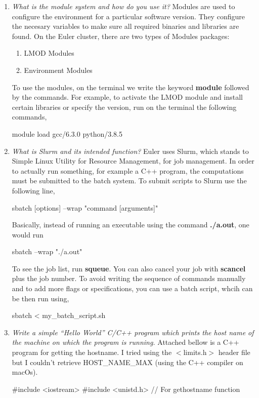 \documentclass[unicode,11pt,a4paper,oneside,numbers=endperiod,openany]{scrartcl}
\begin{document}
\begin{enumerate}

    \item \textit{What is the module system and how do you use it?}
    Modules are used to configure the environment for a particular software version.
    They configure the necesary variables to make sure all required binaries and libraries are found. 
    On the Euler cluster, there are two types of Modules packages:
    \begin{enumerate}
        \item LMOD Modules
        \item Environment Modules 
    \end{enumerate}
    To use the modules, on the terminal we write the keyword \textbf{module} followed by the commands.
    For example, to activate the LMOD module and install certain libraries or specify the version,
    run on the terminal the following commands, 
    \begin{grayverbatim}
module load gcc/6.3.0 python/3.8.5
    \end{grayverbatim}

    \item \textit{What is Slurm and its intended function?}
    Euler uses Slurm, which stands to Simple Linux Utility for Resource Management, for job management.
    In order to actually run something, for example a C++ program, the computations must be
    submitted to the batch system. To submit scripts to Slurm use the following line,
    \begin{grayverbatim}
sbatch [options] --wrap "command [arguments]"
    \end{grayverbatim}
    Basically, instead of running an executable using the command \textbf{./a.out}, one would run 
    \begin{grayverbatim}
sbatch --wrap "./a.out"
    \end{grayverbatim}
    To see the job list, run \textbf{squeue}. You can also cancel your job with \textbf{scancel} 
    plus the job number.
    To avoid writing the sequence of commands manually and to add more flags or specifications, 
    you can use a batch script, whcih can be then run using,
    \begin{grayverbatim}
sbatch < my_batch_script.sh
    \end{grayverbatim}

    \item \textit{Write a simple “Hello World” C/C++ program which prints the host name of the 
    machine on which the program is running. }
    Attached bellow is a C++ program for getting the hostname. 
    I tried using the $<$limits.h$>$ header file but I couldn't retrieve HOST\_NAME\_MAX (using the C++ compiler on macOs).
    \begin{cppverbatim}
#include <iostream>
#include <unistd.h> // For gethostname function


\end{cppverbatim}
\end{enumerate}
\end{document}
